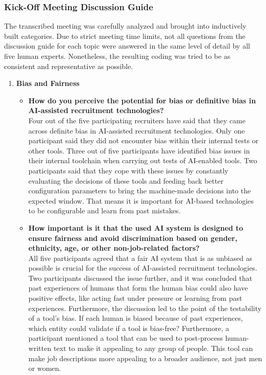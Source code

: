 \documentclass[draft,final]{thesisclass} %
\begin{document}
\subsubsection{Kick-Off Meeting Discussion Guide} \label{kick_off_meeting_data}
The transcribed meeting was carefully analyzed and brought into inductively built categories. Due to strict meeting time limits, not all questions from the discussion guide for each topic were answered in the same level of detail by all five human experts. Nonetheless, the resulting coding was tried to be as consistent and representative as possible.
\begin{enumerate}
    \item \textbf{Bias and Fairness}
    \begin{itemize}
        \item \textbf{How do you perceive the potential for bias or definitive bias in \acs{AI}-assisted recruitment technologies?}\\
        Four out of the five participating recruiters have said that they came across definite bias in \acs{AI}-assisted recruitment technologies. Only one participant said they did not encounter bias within their internal tests or other tools. Three out of five participants have identified bias issues in their internal toolchain when carrying out tests of \acs{AI}-enabled tools. Two participants said that they cope with these issues by constantly evaluating the decisions of these tools and feeding back better configuration parameters to bring the machine-made decisions into the expected window. That means it is important for \acs{AI}-based technologies to be configurable and learn from past mistakes.
        \item \textbf{How important is it that the used \acs{AI} system is designed to ensure fairness and avoid discrimination based on gender, ethnicity, age, or other non-job-related factors?}\\
        All five participants agreed that a fair \acs{AI} system that is as unbiased as possible is crucial for the success of \acs{AI}-assisted recruitment technologies. Two participants discussed the issue further, and it was concluded that past experiences of humans that form the human bias could also have positive effects, like acting fast under pressure or learning from past experiences. Furthermore, the discussion led to the point of the testability of a tool’s bias. If each human is biased because of past experiences, which entity could validate if a tool is bias-free? Furthermore, a participant mentioned a tool that can be used to post-process human-written text to make it appealing to any group of people. This tool can make job descriptions more appealing to a broader audience, not just men or women.

\end{itemize}
\end{enumerate}
\end{document}
